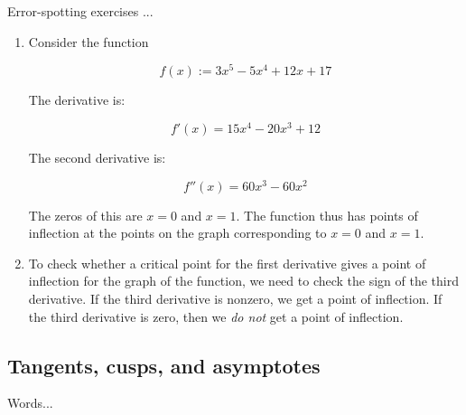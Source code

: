 \documentclass[10pt]{amsart}
\begin{document}
Error-spotting exercises ...

\begin{enumerate}
\item Consider the function

  $$f(x) := 3x^5 - 5x^4 + 12x + 17$$

  The derivative is:

  $$f'(x) = 15x^4 - 20x^3 + 12$$

  The second derivative is:

  $$f''(x) = 60x^3 - 60x^2$$

  The zeros of this are $x = 0$ and $x = 1$. The function thus has
  points of inflection at the points on the graph corresponding to $x
  = 0$ and $x = 1$.
\item To check whether a critical point for the first derivative gives
  a point of inflection for the graph of the function, we need to
  check the sign of the third derivative. If the third derivative is
  nonzero, we get a point of inflection. If the third derivative is
  zero, then we {\em do not} get a point of inflection.
\end{enumerate}

\subsection{Tangents, cusps, and asymptotes}

Words...
\end{document}
